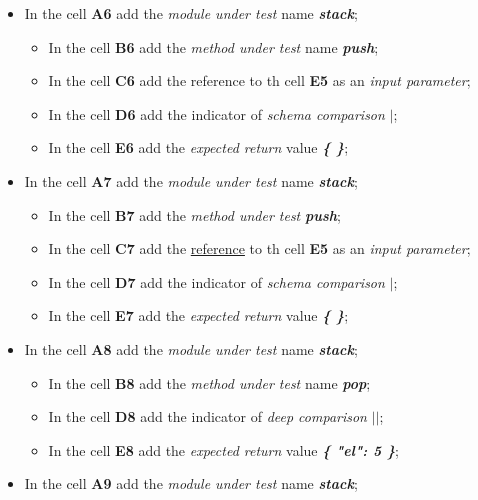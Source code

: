 \begin{itemize}
\begin{itemize}
	\end{itemize}
%	
	\item In the cell \textbf{A6} add the \textit{module under test} name\textit{ \textbf{stack}};
	\begin{itemize}
		\item In the cell \textbf{B6} add the \textit{method under test} name\textit{ \textbf{push}};
		\item In the cell \textbf{C6} add the reference to th cell \textbf{E5} as an \textit{ input parameter};
		\item In the cell \textbf{D6} add the indicator of \textit{schema comparison}\textit{\textbf{ $|$}};
		\item In the cell \textbf{E6} add the \textit{expected return} value\textit{ \textbf{ \{ \}}};
	\end{itemize}
%	
	\item In the cell \textbf{A7} add the \textit{module under test} name\textit{\textbf{ stack}};
	\begin{itemize}
		\item In the cell \textbf{B7} add the \textit{method under test} \textit{\textbf{push}};
		\item In the cell \textbf{C7} add the \underline{reference} to th cell \textbf{E5} as an\textit{ input parameter};
		\item In the cell \textbf{D7} add the indicator of \textit{schema comparison} \textit{\textbf{$|$}};
		\item In the cell \textbf{E7} add the \textit{expected return} value\textit{ \textbf{ \{ \}}};
	\end{itemize}
%	
	\item In the cell \textbf{A8} add the \textit{module under test} name\textit{ \textbf{stack}};
	\begin{itemize}
		\item In the cell \textbf{B8} add the \textit{method under test} name \textit{\textbf{pop}};
		\item In the cell \textbf{D8} add the indicator of \textit{deep comparison} \textit{\textbf{$||$}};
		\item In the cell \textbf{E8} add the \textit{expected return} value\textit{ \textbf{ \{ "el": 5 \}}};
	\end{itemize}
%	
	\item In the cell \textbf{A9} add the \textit{module under test} name\textit{ \textbf{stack}};

\end{itemize}
